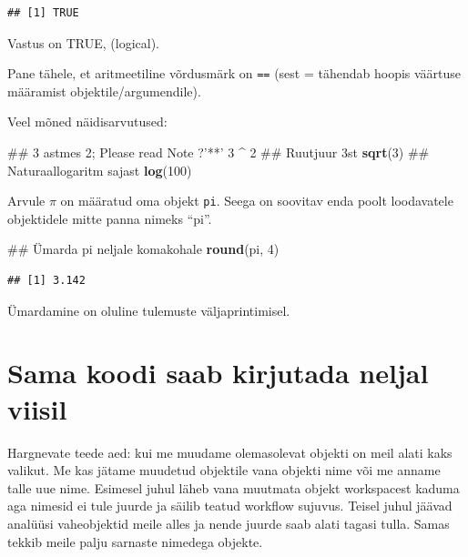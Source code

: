 \documentclass[]{book}
\newenvironment{Shaded}{\begin{snugshade}}{\end{snugshade}}
\newcommand{\KeywordTok}[1]{\textcolor[rgb]{0.13,0.29,0.53}{\textbf{#1}}}
\newcommand{\DecValTok}[1]{\textcolor[rgb]{0.00,0.00,0.81}{#1}}
\newcommand{\StringTok}[1]{\textcolor[rgb]{0.31,0.60,0.02}{#1}}
\newcommand{\OperatorTok}[1]{\textcolor[rgb]{0.81,0.36,0.00}{\textbf{#1}}}
\newcommand{\NormalTok}[1]{#1}
\begin{document}
\begin{verbatim}
## [1] TRUE
\end{verbatim}

Vastus on TRUE, (logical).

Pane tähele, et aritmeetiline võrdusmärk on \texttt{==} (sest = tähendab
hoopis väärtuse määramist objektile/argumendile).

Veel mõned näidisarvutused:

\begin{Shaded}
\begin{Highlighting}[]
\NormalTok{## 3 astmes 2; Please read Note ?'**' }
\DecValTok{3} \OperatorTok{^}\StringTok{ }\DecValTok{2}
\NormalTok{## Ruutjuur 3st}
\KeywordTok{sqrt}\NormalTok{(}\DecValTok{3}\NormalTok{)}
\NormalTok{## Naturaallogaritm sajast}
\KeywordTok{log}\NormalTok{(}\DecValTok{100}\NormalTok{)}
\end{Highlighting}
\end{Shaded}

Arvule \(\pi\) on määratud oma objekt \texttt{pi}. Seega on soovitav
enda poolt loodavatele objektidele mitte panna nimeks ``pi''.

\begin{Shaded}
\begin{Highlighting}[]
\NormalTok{## Ümarda pi neljale komakohale}
\KeywordTok{round}\NormalTok{(pi, }\DecValTok{4}\NormalTok{)}
\end{Highlighting}
\end{Shaded}

\begin{verbatim}
## [1] 3.142
\end{verbatim}

Ümardamine on oluline tulemuste väljaprintimisel.

\section{Sama koodi saab kirjutada neljal
viisil}\label{sama-koodi-saab-kirjutada-neljal-viisil}

Hargnevate teede aed: kui me muudame olemasolevat objekti on meil alati
kaks valikut. Me kas jätame muudetud objektile vana objekti nime või me
anname talle uue nime. Esimesel juhul läheb vana muutmata objekt
workspacest kaduma aga nimesid ei tule juurde ja säilib teatud workflow
sujuvus. Teisel juhul jäävad analüüsi vaheobjektid meile alles ja nende
juurde saab alati tagasi tulla. Samas tekkib meile palju sarnaste
nimedega objekte.
\end{document}
